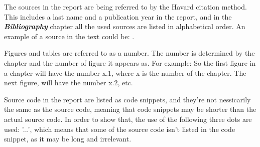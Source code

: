 The sources in the report are being referred to by the Havard citation method. This includes a last name and a publication year in the report, and in the \textit{\textbf{Bibliography}} chapter all the used sources are listed in alphabetical order. \newline
An example of a source in the text could be: \citep{Sebesta}.
\newline

Figures and tables are referred to as a number. The number is determined by the chapter and the number of figure it appears as. \newline
For example: So the first figure in a chapter will have the number x.1, where x is the number of the chapter. The next figure, will have the number x.2, etc. 
\newline

Source code in the report are listed as code snippets, and they're not nessicarily the same as the source code, meaning that code snippets may be shorter than the actual source code. In order to show that, the use of the following three dots are used: '...', which means that some of the source code isn't listed in the code snippet, as it may be long and irrelevant. 

